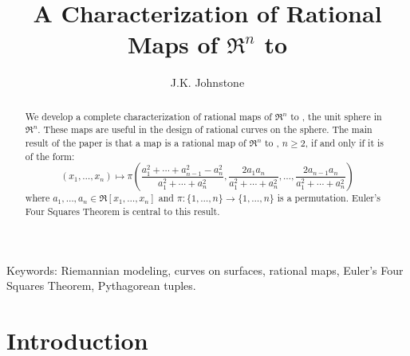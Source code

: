 \newif\ifFull
\Fullfalse

\SingleSpace

\setlength{\oddsidemargin}{0pt}
\setlength{\topmargin}{-.25in}	%
\setlength{\headsep}{3em}
\setlength{\textheight}{8.75in}
\setlength{\textwidth}{6.5in}
\setlength{\columnsep}{5mm}		%

\pagestyle{myheadings}


\title{A Characterization of Rational Maps of $\Re^n$ to }
\author{J.K. Johnstone}


\maketitle

\begin{abstract}
We develop a complete characterization of rational
maps of $\Re^n$ to , the unit sphere in $\Re^n$.
These maps are useful in the design of rational curves on the sphere.
The main result of the paper is that
a map is a rational map of $\Re^n$ to , $n \geq 2$, if and only if
it is of the form:
\[
	(x_1,\ldots,x_n) \mapsto 
	\pi (\frac{a_1^2 + \cdots + a_{n-1}^2 - a_n^2}{a_1^2 + \cdots + a_n^2},
	 \frac{2a_1a_n}{a_1^2 + \cdots + a_n^2},
	 \ldots,
	 \frac{2a_{n-1}a_n}{a_1^2 + \cdots + a_n^2})
\]
where $a_1,\ldots,a_n \in \Re[x_1,\ldots,x_n]$
and $\pi: \{1,\ldots,n\} \rightarrow \{1,\ldots,n\}$ is a permutation.
Euler's Four Squares Theorem is central to this result.
\end{abstract}

\vspace{1in}

\noindent Keywords: 
Riemannian modeling, curves on surfaces, rational maps, 
Euler's Four Squares Theorem, Pythagorean tuples.

\clearpage

\section{Introduction}

